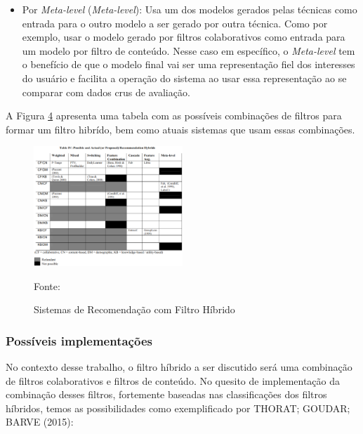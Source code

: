 \begin{itemize}
    \item Por \textit{Meta-level} (\textit{Meta-level}): Usa um dos modelos gerados pelas técnicas como entrada 
    para o outro modelo a ser gerado por outra técnica.
    Como por exemplo, usar o modelo gerado por filtros colaborativos como entrada para um modelo por filtro de conteúdo.
    Nesse caso em específico, o \textit{Meta-level} tem o benefício de que o modelo final vai ser uma representação fiel
    dos interesses do usuário e facilita a operação do sistema ao usar essa representação ao se comparar com dados crus 
    de avaliação.
\end{itemize}

A Figura \hyperref[fig:allhybrid]{4} apresenta uma tabela com as possíveis combinações de filtros para formar um filtro
hibrído, bem como atuais sistemas que usam essas combinações.
\begin{figure}[htbp]
    \centering
    \includegraphics[width=0.5\textwidth]{figuras/allhybrid.eps}
    \caption{Sistemas de Recomendação com Filtro Híbrido}
    \label{fig:allhybrid}
    \small Fonte: \cite{burke2002hybrid}
\end{figure}

\subsubsection{Possíveis implementações}\label{subsubsec:implemfh}
No contexto desse trabalho, o filtro híbrido a ser discutido será uma combinação de filtros colaborativos e filtros de 
conteúdo. No quesito de implementação da combinação desses filtros, fortemente baseadas nas classificações dos filtros 
híbridos, temos as possibilidades como exemplificado por THORAT; GOUDAR; BARVE (2015):

